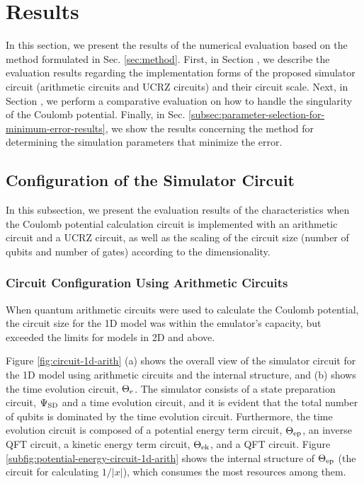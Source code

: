 \documentclass[jctc-draft.tex]{subfiles}
\begin{document}
\section{Results}
In this section, we present the results of the numerical evaluation based on the
method formulated in Sec. \ref{sec:method}. First, in Section
, we describe the evaluation results
regarding the implementation forms of the proposed simulator circuit (arithmetic
circuits and UCRZ circuits) and their circuit scale. Next, in Section
, we perform a comparative
evaluation on how to handle the singularity of the Coulomb potential. Finally,
in Sec. \ref{subsec:parameter-selection-for-minimum-error-results}, we show
the results concerning the method for determining the simulation parameters that
minimize the error.

\subsection{Configuration of the Simulator Circuit}
\label{subsec:circuit-configuration-results}
In this subsection, we present the evaluation results of the characteristics
when the Coulomb potential calculation circuit is implemented with an arithmetic
circuit and a UCRZ circuit, as well as the scaling of the circuit size (number
of qubits and number of gates) according to the dimensionality.

\subsubsection{Circuit Configuration Using Arithmetic Circuits}
\label{subsubsec:arithmetic-circuit-configuration-results}
When quantum arithmetic circuits were used to calculate the Coulomb potential,
the circuit size for the 1D model was within the emulator's capacity, but
exceeded the limits for models in 2D and above.

Figure \ref{fig:circuit-1d-arith} (a) shows the overall view of the simulator
circuit for the 1D model using arithmetic circuits and the internal structure,
and (b) shows the time evolution circuit, $\Theta_{\mathrm{e}}$. The simulator consists of a
state preparation circuit, $\Psi_{\mathrm{SD}}$ and a time evolution circuit, and it is
evident that the total number of qubits is dominated by the time evolution
circuit. Furthermore, the time evolution circuit is composed of a potential
energy term circuit, $\Theta_{\mathrm{ep}}$, an inverse QFT circuit, a kinetic energy term
circuit, $\Theta_{\mathrm{ek}}$, and a QFT circuit. Figure
\ref{subfig:potential-energy-circuit-1d-arith} shows the internal structure of
$\Theta_{\mathrm{ep}}$ (the circuit for calculating $1/|x|$), which consumes the most
resources among them.
\end{document}

